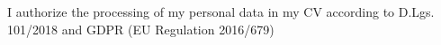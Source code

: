 
\begin{cvparagraph}

I authorize the processing of my personal data in my CV according to D.Lgs. 101/2018 and GDPR (EU Regulation 2016/679)
\end{cvparagraph}